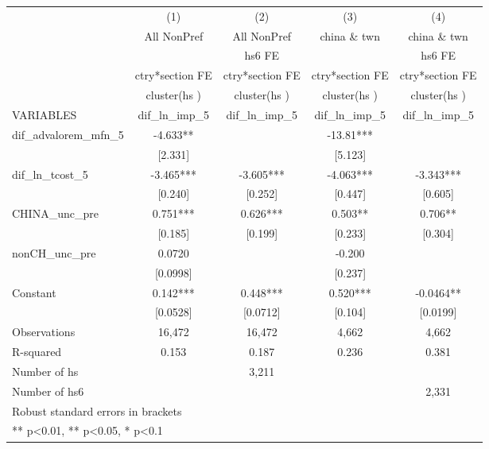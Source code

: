 \begin{tabular}{lcccc}
\toprule
 & (1) & (2) & (3) & (4) \\
 & All NonPref & All NonPref & china \& twn & china \& twn \\
 &  & hs6 FE &  & hs6 FE \\
 & ctry*section FE & ctry*section FE & ctry*section FE & ctry*section FE \\
 & cluster(hs ) & cluster(hs ) & cluster(hs ) & cluster(hs ) \\
VARIABLES & dif\_ln\_imp\_5 & dif\_ln\_imp\_5 & dif\_ln\_imp\_5 & dif\_ln\_imp\_5 \\
\midrule
dif\_advalorem\_mfn\_5 & -4.633** &  & -13.81*** &  \\
 & [2.331] &  & [5.123] &  \\
dif\_ln\_tcost\_5 & -3.465*** & -3.605*** & -4.063*** & -3.343*** \\
 & [0.240] & [0.252] & [0.447] & [0.605] \\
CHINA\_unc\_pre & 0.751*** & 0.626*** & 0.503** & 0.706** \\
 & [0.185] & [0.199] & [0.233] & [0.304] \\
nonCH\_unc\_pre & 0.0720 &  & -0.200 &  \\
 & [0.0998] &  & [0.237] &  \\
Constant & 0.142*** & 0.448*** & 0.520*** & -0.0464** \\
 & [0.0528] & [0.0712] & [0.104] & [0.0199] \\
\midrule
Observations & 16,472 & 16,472 & 4,662 & 4,662 \\
R-squared & 0.153 & 0.187 & 0.236 & 0.381 \\
Number of hs &  & 3,211 &  &  \\
Number of hs6 &  &  &  & 2,331 \\
\bottomrule
\multicolumn{5}{l}{\footnotesize Robust standard errors in brackets} \\
\multicolumn{5}{l}{\footnotesize *** p<0.01, ** p<0.05, * p<0.1} \\
\end{tabular}
